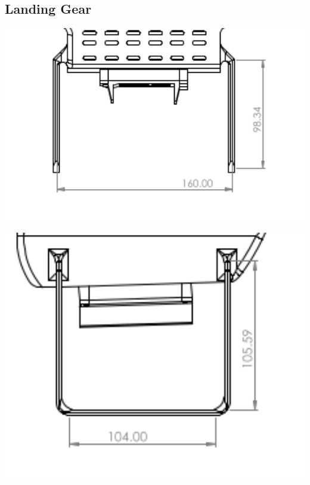 \documentclass[12pt]{report}
\begin{document}
\subsection*{Landing Gear}
      \begin{minipage}{0.4\textwidth}
        \centering
        \includegraphics[width=1\textwidth]{landing1.png}
      \end{minipage}%
      \hfill
      \begin{minipage}{0.32\textwidth}
          \centering
          \includegraphics[width=1\textwidth]{landing2.png}
      \end{minipage}%
\end{document}

